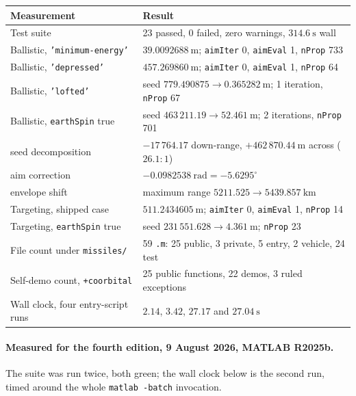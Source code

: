 \documentclass[11pt]{article}
\newcommand{\code}[1]{\texttt{#1}}
\newcommand{\pkg}[1]{\texttt{+#1}}
\begin{document}
\begin{center}
\begin{tabular}{ll}
\toprule
Measurement & Result \\
\midrule
Test suite                             & 23 passed, 0 failed, zero warnings, $314.6~\mathrm{s}$ wall \\
Ballistic, \code{'minimum-energy'}     & $39.0092688~\mathrm{m}$; \code{aimIter} 0, \code{aimEval} 1, \code{nProp} 733 \\
Ballistic, \code{'depressed'}          & $457.269860~\mathrm{m}$; \code{aimIter} 0, \code{aimEval} 1, \code{nProp} 64 \\
Ballistic, \code{'lofted'}             & seed $779.490875 \to 0.365282~\mathrm{m}$; 1 iteration, \code{nProp} 67 \\
Ballistic, \code{earthSpin} true       & seed $463\,211.19 \to 52.461~\mathrm{m}$; 2 iterations, \code{nProp} 701 \\
\quad seed decomposition               & $-17\,764.17$ down-range, $+462\,870.44~\mathrm{m}$ across ($26.1{:}1$) \\
\quad aim correction                   & $-0.0982538~\mathrm{rad} = -5.6295^\circ$ \\
\quad envelope shift                   & maximum range $5211.525 \to 5439.857~\mathrm{km}$ \\
Targeting, shipped case                & $511.2434605~\mathrm{m}$; \code{aimIter} 0, \code{aimEval} 1, \code{nProp} 14 \\
Targeting, \code{earthSpin} true       & seed $231\,551.628 \to 4.361~\mathrm{m}$; \code{nProp} 23 \\
File count under \code{missiles/}      & 59 \code{.m}: 25 public, 3 private, 5 entry, 2 vehicle, 24 test \\
Self-demo count, \pkg{coorbital}       & 25 public functions, 22 demos, 3 ruled exceptions \\
Wall clock, four entry-script runs     & $2.14$, $3.42$, $27.17$ and $27.04~\mathrm{s}$ \\
\bottomrule
\end{tabular}
\end{center}

\paragraph{Measured for the fourth edition, 9 August 2026, MATLAB R2025b.} The
suite was run twice, both green; the wall clock below is the second run, timed
around the whole \code{matlab -batch} invocation.
\end{document}
